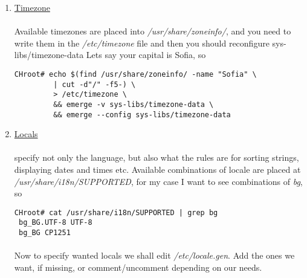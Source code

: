 \documentclass[10pt,a4paper]{article}
\begin{document}
                \begin{enumerate}
                    \item  \href{https://wiki.gentoo.org/wiki/Handbook:AMD64/Installation/Base#Timezone}{Timezone}
                    
                        \paragraph{} Available timezones are placed into \textit{/usr/share/zoneinfo/}, and you need to write them in the \textit{/etc/timezone} file and then you should reconfigure  sys-libs/timezone-data Lets say your capital is Sofia, so
                        
\begin{lstlisting}[style=BashInputCHRoot]
 CHroot# echo $(find /usr/share/zoneinfo/ -name "Sofia" \
         | cut -d"/" -f5-) \
         > /etc/timezone \
         && emerge -v sys-libs/timezone-data \
         && emerge --config sys-libs/timezone-data
\end{lstlisting}
                    
                    \newpage
                    \item   \href{https://wiki.gentoo.org/wiki/Handbook:AMD64/Installation/Base#Configure_locales}{Locals}
                    
                    \paragraph{} specify not only the language, but also what the rules are for sorting strings, displaying dates and times etc. Available combinations of locale are placed at \textit{/usr/share/i18n/SUPPORTED}, for my case I want to see combinations of \textit{bg}, so
                    
\begin{lstlisting}[style=BashInputCHRoot]
 CHroot# cat /usr/share/i18n/SUPPORTED | grep bg
 bg_BG.UTF-8 UTF-8
 bg_BG CP1251
\end{lstlisting}             
                    
                    \paragraph{} Now to specify wanted locals we shall edit \textit{/etc/locale.gen}. Add the ones we want, if missing, or comment/uncomment depending on our needs.
                    

\end{enumerate}
\end{document}
